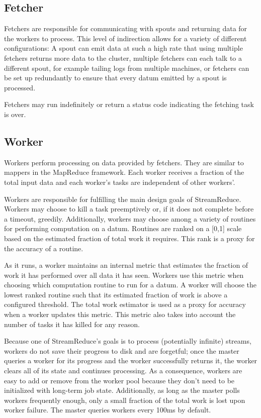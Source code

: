 \documentclass[12pt,twocolumn]{article}
\begin{document}
\subsection{Fetcher}
Fetchers are responsible for communicating with spouts and returning data for the
workers to process. This level of indirection allows for a variety of different
configurations: A spout can emit data at such a high rate that using multiple fetchers
returns more data to the cluster, multiple fetchers can each talk to a different spout,
for example tailing logs from multiple machines, or fetchers can be set up redundantly
to ensure that every datum emitted by a spout is processed.

Fetchers may run indefinitely or return a status code indicating
the fetching task is over.
\subsection{Worker}
Workers perform processing on data provided by fetchers. They are similar to mappers
in the MapReduce framework. Each worker receives a fraction of the total input data
and each worker's tasks are independent of other workers'.

Workers are responsible for fulfilling the main design goals of StreamReduce. Workers may choose
to kill a task preemptively or, if it does not complete before a timeout, greedily. Additionally,
workers may choose among a variety of routines for performing computation on a datum.
Routines are ranked on a [0,1] scale based on the estimated fraction of total work it
requires. This rank is a proxy for the accuracy of a routine.

As it runs, a worker maintains an internal metric that estimates the fraction of work
it has performed over all data it has seen. Workers use this metric when choosing which
computation routine to run for a datum. A worker will choose the lowest ranked routine
such that its estimated fraction of work is above a configured threshold.
The total work estimator is used as a proxy for accuracy when a worker updates
this metric. This metric also takes into account the number of tasks it has killed
for any reason.

Because one of StreamReduce's goals is to process (potentially infinite) streams, workers do not
save their progress to disk and are forgetful; once the master queries a worker for its
progress and the worker successfully returns it, the worker clears all of its state and
continues processing. As a consequence, workers are easy to add or remove from the worker
pool because they don't need to be initialized with long-term job state. Additionally, as
long as the master polls workers frequently enough, only a small
fraction of the total work is lost upon worker failure.
The master queries workers every 100ms by default.
\end{document}
